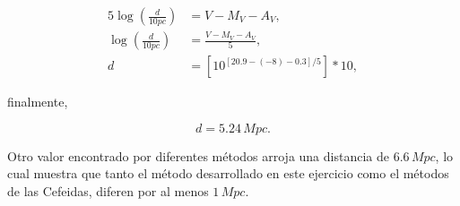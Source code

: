 \documentclass[paper=a4, fontsize=10pt]{scrartcl} %
\begin{document}
\begin{align*}
5\log \left(\frac{d}{10pc} \right) & = V - M_V - A_V, \\
\log \left(\frac{d}{10pc} \right) & = \frac{V-M_V-A_V}{5}, \\
d & = \left[10^{[20.9-(-8)-0.3]/5}\right]*10,
\end{align*}

finalmente, 

\begin{equation}
d = 5.24 \, Mpc.
\end{equation}

Otro valor encontrado por diferentes métodos arroja una distancia de $6.6 \, Mpc$, lo cual muestra que tanto el método desarrollado en este ejercicio como el métodos de las Cefeidas, diferen por al menos $1 \, Mpc$.
 
\end{document}
